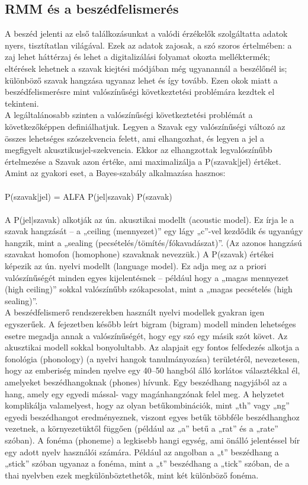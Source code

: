 \documentclass[a4paper,12pt]{paper}
\begin{document}
\subsection{RMM és a beszédfelismerés}
A beszéd jelenti az első találkozásunkat a valódi érzékelők szolgáltatta adatok nyers, tisztítatlan világával. Ezek az adatok zajosak, a szó szoros értelmében: a zaj lehet háttérzaj és lehet a digitalizálási folyamat okozta melléktermék; eltérések lehetnek a szavak kiejtési módjában még ugyanannál a beszélőnél is; különböző szavak hangzása ugyanaz lehet és így tovább. Ezen okok miatt a beszédfelismerésre mint valószínűségi következtetési problémára kezdtek el tekinteni.
\\A legáltalánosabb szinten a valószínűségi következtetési problémát a következőképpen definiálhatjuk. Legyen a Szavak egy valószínűségi változó az összes lehetséges szószekvencia felett, ami elhangozhat, és legyen a jel a megfigyelt akusztikusjel-szekvencia. Ekkor az elhangzottak legvalószínűbb értelmezése a Szavak azon értéke, ami maximalizálja a P(szavak|jel) értéket. Amint az gyakori eset, a Bayes-szabály alkalmazása hasznos:
\\\\
P(szavak|jel) = ALFA P(jel|szavak) P(szavak) 
\\\\
A P(jel|szavak) alkotják az ún. akusztikai modellt (acoustic model). Ez írja le a szavak hangzását – a „ceiling (mennyezet)” egy lágy „c”-vel kezdődik és ugyanúgy hangzik, mint a „sealing (pecsételés/tömítés/fókavadászat)”. (Az azonos hangzású szavakat homofon (homophone) szavaknak nevezzük.) A P(szavak) értékei képezik az ún. nyelvi modellt (language model). Ez adja meg az a priori valószínűségét minden egyes kijelentésnek – például hogy a „magas mennyezet (high ceiling)” sokkal valószínűbb szókapcsolat, mint a „magas pecsételés (high sealing)”.
\\A beszédfelismerő rendszerekben használt nyelvi modellek gyakran igen egyszerűek. A fejezetben később leírt bigram (bigram) modell minden lehetséges esetre megadja annak a valószínűségét, hogy egy szó egy másik szót követ. Az akusztikai modell sokkal bonyolultabb. Az alapjait egy fontos felfedezés alkotja a fonológia (phonology) (a nyelvi hangok tanulmányozása) területéről, nevezetesen, hogy az emberiség minden nyelve egy 40–50 hangból álló korlátos választékkal él, amelyeket beszédhangoknak (phones) hívunk. Egy beszédhang nagyjából az a hang, amely egy egyedi mással- vagy magánhangzónak felel meg. A helyzetet komplikálja valamelyest, hogy az olyan betűkombinációk, mint „th” vagy „ng” egyedi beszédhangot eredményeznek, viszont egyes betűk többféle beszédhanghoz vezetnek, a környezetüktől függően (például az „a” betű a „rat” és a „rate” szóban). A fonéma (phoneme) a legkisebb hangi egység, ami önálló jelentéssel bír egy adott nyelv használói számára. Például az angolban a „t” beszédhang a „stick” szóban ugyanaz a fonéma, mint a „t” beszédhang a „tick” szóban, de a thai nyelvben ezek megkülönböztethetők, mint két különböző fonéma.
\end{document}
